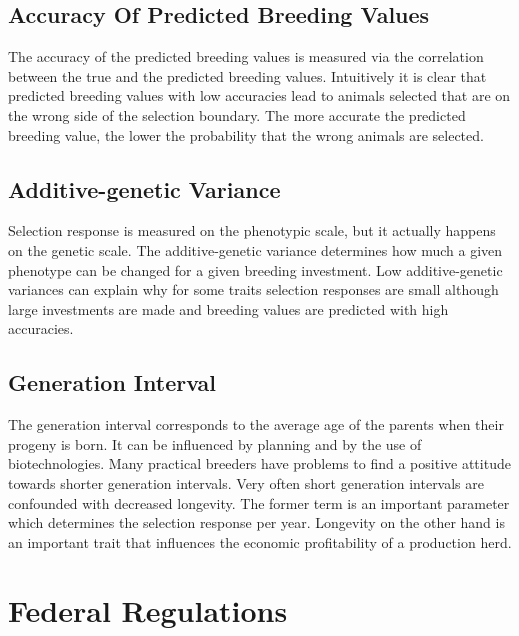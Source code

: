 \documentclass[
]{book}
\begin{document}
\hypertarget{gel-bprog-accpredbv}{%
\subsection{Accuracy Of Predicted Breeding Values}\label{gel-bprog-accpredbv}}

The accuracy of the predicted breeding values is measured via the correlation between the true and the predicted breeding values. Intuitively it is clear that predicted breeding values with low accuracies lead to animals selected that are on the wrong side of the selection boundary. The more accurate the predicted breeding value, the lower the probability that the wrong animals are selected.

\hypertarget{gel-bprog-addgenvar}{%
\subsection{Additive-genetic Variance}\label{gel-bprog-addgenvar}}

Selection response is measured on the phenotypic scale, but it actually happens on the genetic scale. The additive-genetic variance determines how much a given phenotype can be changed for a given breeding investment. Low additive-genetic variances can explain why for some traits selection responses are small although large investments are made and breeding values are predicted with high accuracies.

\hypertarget{gel-bprog-genint}{%
\subsection{Generation Interval}\label{gel-bprog-genint}}

The generation interval corresponds to the average age of the parents when their progeny is born. It can be influenced by planning and by the use of biotechnologies. Many practical breeders have problems to find a positive attitude towards shorter generation intervals. Very often short generation intervals are confounded with decreased longevity. The former term is an important parameter which determines the selection response per year. Longevity on the other hand is an important trait that influences the economic profitability of a production herd.

\hypertarget{gel-bprog-fedreg}{%
\section{Federal Regulations}\label{gel-bprog-fedreg}}
\end{document}
